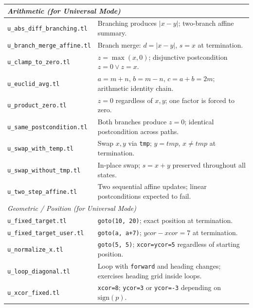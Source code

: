 {\begin{longtable}{p{} p{}}
\midrule
\multicolumn{2}{l}{\textit{Arithmetic (for Universal Mode)}} \\
\midrule
\texttt{u\_abs\_diff\_branching.tl}   & Branching produces $|x-y|$; two-branch affine summary. \\
\texttt{u\_branch\_merge\_affine.tl}  & Branch merge: $d{=}|x{-}y|$, $s{=}x$ at termination. \\
\texttt{u\_clamp\_to\_zero.tl}        & $z = \max(x,0)$; disjunctive postcondition $z{=}0 \lor z{=}x$. \\
\texttt{u\_euclid\_avg.tl}            & $a{=}m{+}n$, $b{=}m{-}n$, $c{=}a{+}b{=}2m$; arithmetic identity chain. \\
\texttt{u\_product\_zero.tl}          & $z{=}0$ regardless of $x,y$; one factor is forced to zero. \\
\texttt{u\_same\_postcondition.tl}    & Both branches produce $z{=}0$; identical postcondition across paths. \\
\texttt{u\_swap\_with\_temp.tl}       & Swap $x,y$ via \texttt{tmp}; $y{=}\mathit{tmp}$, $x{\neq}\mathit{tmp}$ at termination. \\
\texttt{u\_swap\_without\_tmp.tl}     & In-place swap; $s{=}x{+}y$ preserved throughout all states. \\
\texttt{u\_two\_step\_affine.tl}      & Two sequential affine updates; linear postconditions expected to fail. \\

\midrule
\multicolumn{2}{l}{\textit{Geometric / Position (for Universal Mode)}} \\
\midrule
\texttt{u\_fixed\_target.tl}          & \texttt{goto(10,\,20)}; exact position at termination. \\
\texttt{u\_fixed\_target\_user.tl}    & \texttt{goto(a,\,a+7)}; $\mathit{ycor}{-}\mathit{xcor}{=}7$ at termination. \\
\texttt{u\_normalize\_x.tl}           & \texttt{goto(5,\,5)}; \texttt{xcor=ycor=5} regardless of starting position. \\
\texttt{u\_loop\_diagonal.tl}         & Loop with \texttt{forward} and heading changes; exercises heading grid inside loops. \\
\texttt{u\_xcor\_fixed.tl}            & \texttt{xcor=8}; \texttt{ycor=3} or \texttt{ycor=-3} depending on $\mathrm{sign}(p)$. \\


\end{longtable}}
